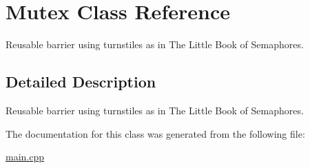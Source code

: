 \hypertarget{class_mutex}{}\section{Mutex Class Reference}
\label{class_mutex}


Reusable barrier using turnstiles as in The Little Book of Semaphores.  




\subsection{Detailed Description}
Reusable barrier using turnstiles as in The Little Book of Semaphores. 

The documentation for this class was generated from the following file\+:\begin{DoxyCompactItemize}
\item 
\mbox{\hyperlink{main_8cpp}{main.\+cpp}}\end{DoxyCompactItemize}
